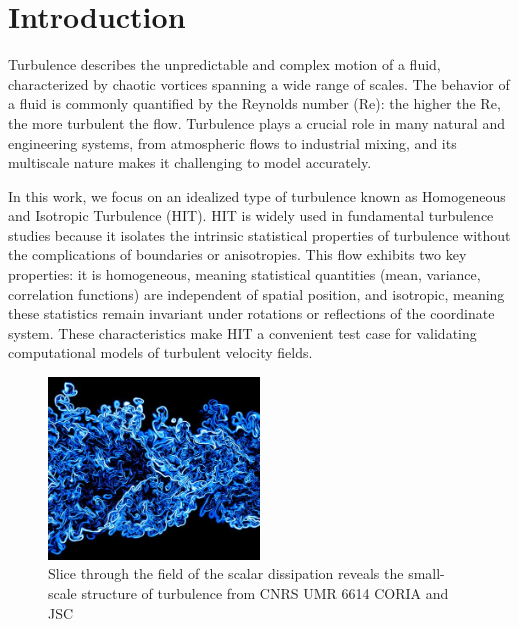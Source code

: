 \documentclass[a4paper,12pt]{article}
\theoremstyle{definition}
\begin{document}
\newpage
\tableofcontents
\newpage

\section{Introduction}
Turbulence describes the unpredictable and complex motion of a fluid, characterized by chaotic vortices spanning a wide range of scales. The behavior of a fluid is commonly quantified by the Reynolds number (Re): the higher the Re, the more turbulent the flow. Turbulence plays a crucial role in many natural and engineering systems, from atmospheric flows to industrial mixing, and its multiscale nature makes it challenging to model accurately.

In this work, we focus on an idealized type of turbulence known as Homogeneous and Isotropic Turbulence (HIT). HIT is widely used in fundamental turbulence studies because it isolates the intrinsic statistical properties of turbulence without the complications of boundaries or anisotropies. This flow exhibits two key properties: it is homogeneous, meaning statistical quantities (mean, variance, correlation functions) are independent of spatial position, and isotropic, meaning these statistics remain invariant under rotations or reflections of the coordinate system. These characteristics make HIT a convenient test case for validating computational models of turbulent velocity fields.


\begin{figure}[H]
    \centering
    \includegraphics[width=0.5\textwidth]{illustrations/TurbulenceExample.jpg}
    \caption{Slice through the field of the scalar dissipation reveals the small-scale structure of turbulence from CNRS UMR 6614 CORIA and JSC}
\end{figure}
\end{document}
